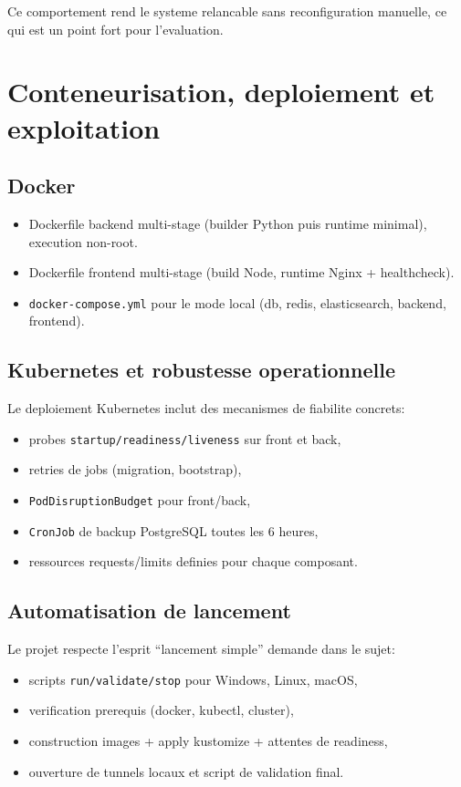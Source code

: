 \documentclass[11pt,a4paper]{article}
\begin{document}
Ce comportement rend le systeme relancable sans reconfiguration manuelle, ce qui est un point fort pour l'evaluation.

\section{Conteneurisation, deploiement et exploitation}

\subsection{Docker}

\begin{itemize}
  \item Dockerfile backend multi-stage (builder Python puis runtime minimal), execution non-root.
  \item Dockerfile frontend multi-stage (build Node, runtime Nginx + healthcheck).
  \item \texttt{docker-compose.yml} pour le mode local (db, redis, elasticsearch, backend, frontend).
\end{itemize}

\subsection{Kubernetes et robustesse operationnelle}

Le deploiement Kubernetes inclut des mecanismes de fiabilite concrets:
\begin{itemize}
  \item probes \texttt{startup/readiness/liveness} sur front et back,
  \item retries de jobs (migration, bootstrap),
  \item \texttt{PodDisruptionBudget} pour front/back,
  \item \texttt{CronJob} de backup PostgreSQL toutes les 6 heures,
  \item ressources requests/limits definies pour chaque composant.
\end{itemize}

\subsection{Automatisation de lancement}

Le projet respecte l'esprit ``lancement simple'' demande dans le sujet:
\begin{itemize}
  \item scripts \texttt{run/validate/stop} pour Windows, Linux, macOS,
  \item verification prerequis (docker, kubectl, cluster),
  \item construction images + apply kustomize + attentes de readiness,
  \item ouverture de tunnels locaux et script de validation final.
\end{itemize}
\end{document}
